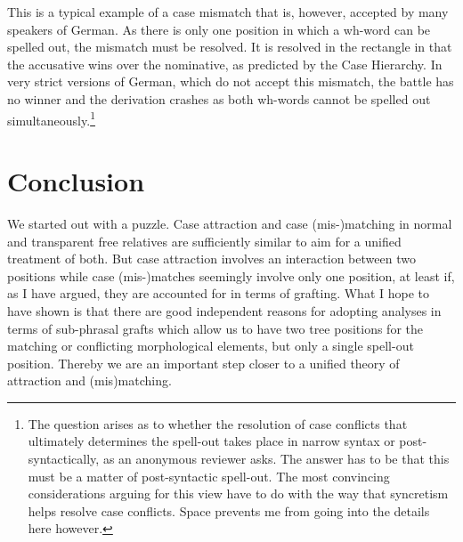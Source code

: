 \documentclass[output=paper]{langsci/langscibook}
\begin{document}
\begin{refcontext}
\begin{figure}[H]
\end{figure}

This is a typical example of a case mismatch that is, however, accepted by many
speakers of German. As there is only one position in which a wh-word can be
spelled out, the mismatch must be resolved. It is resolved in the rectangle in
that the accusative wins over the nominative, as predicted by the Case
Hierarchy. In very strict versions of German, which do not accept this
mismatch, the battle has no winner and the derivation crashes as both
wh-words
cannot be spelled out simultaneously.\footnote{The question arises as to whether
the resolution of case conflicts that ultimately determines the spell-out takes
place in narrow syntax or post-syntactically, as an anonymous reviewer asks.
The answer has to be that this must be a matter of post-syntactic spell-out.
The most convincing considerations arguing for this view have to do with the
way that syncretism helps resolve case conflicts. Space prevents me from going
into the details here however.}\\

\section{Conclusion}

We started out with a puzzle. Case attraction and case (mis-)matching in normal
and transparent free relatives are sufficiently similar to aim for a unified
treatment of both. But case attraction involves an interaction between two
positions while case (mis-)matches seemingly involve only one position, at
least if, as I have argued, they are accounted for in terms of grafting. What
I hope to have shown is that there are good independent reasons for adopting
analyses in terms of sub-phrasal grafts which allow us to have two tree
positions for the matching or conflicting morphological elements, but only a
single spell-out position. Thereby we are an important step closer to a unified
theory of attraction and (mis)matching.

\printchapterglossary{}


\end{refcontext}
\end{document}

